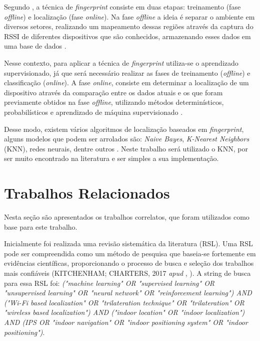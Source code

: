 \documentclass[12pt]{artigoifce}
\begin{document}
Segundo , a técnica de \textit{fingerprint} consiste em duas etapas: treinamento (fase \textit{offline}) e localização (fase \textit{online}). Na fase \textit{offline} a ideia é separar o ambiente em diversos setores, realizando um mapeamento dessas regiões através da captura do RSSI de diferentes dispositivos que são conhecidos, armazenando esses dados em uma base de dados \cite{tatsch2019}. 

Nesse contexto, para aplicar a técnica de \textit{fingerprint} utiliza-se o aprendizado supervisionado, já que será necessário realizar as fases de treinamento (\textit{offline}) e classificação (\textit{online}). A fase \textit{online}, consiste em determinar a localização de um dispositivo através da comparação entre os dados atuais e os que foram previamente obtidos na fase \textit{offline}, utilizando métodos determinísticos, probabilísticos e aprendizado de máquina supervisionado \cite{mari2018, tatsch2019}. 

Desse modo, existem vários algoritmos de localização baseados em \textit{fingerprint}, alguns modelos que podem ser arrolados são: \textit{Naive Bayes}, \textit{K-Nearest Neighbors} (KNN), redes neurais, dentre outros \cite{oliveira2021}. Neste trabalho será utilizado o KNN, por ser muito encontrado na literatura e ser simples a sua implementação.

\section{Trabalhos Relacionados}
\label{sec-trabalhos-relacionados}

Nesta seção são apresentados os trabalhos correlatos, que foram utilizados como base para este trabalho. %

Inicialmente foi realizada uma revisão sistemática da literatura (RSL). Uma RSL pode ser compreendida como um método de pesquisa que baseia-se fortemente em evidências científicas, proporcionando o processo de busca e seleção dos trabalhos mais confiáveis (KITCHENHAM; CHARTERS, 2017 \textit{apud} \citeauthor{lima2020}, \citeyear{lima2020}). A string de busca para essa RSL foi: \textit{("machine learning" OR "supervised learning" OR "unsupervised learning" OR "neural network" OR "reinforcement learning") AND ("Wi-Fi based localization" OR "trilateration technique" OR "trilateration" OR "wireless based localization") AND ("indoor location" OR "indoor localization") AND (IPS OR "indoor navigation" OR "indoor positioning system" OR "indoor positioning")}. 
\end{document}
